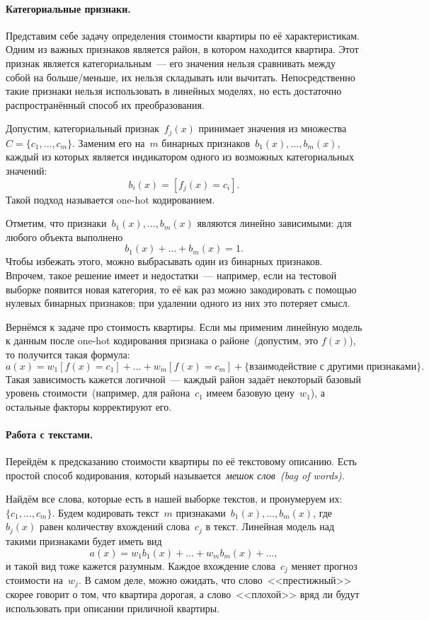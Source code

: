 \documentclass[12pt,fleqn]{article}
\begin{document}
\paragraph{Категориальные признаки.}
Представим себе задачу определения стоимости квартиры по её характеристикам.
Одним из важных признаков является район, в котором находится квартира.
Этот признак является категориальным~--- его значения нельзя сравнивать между собой на больше/меньше,
их нельзя складывать или вычитать.
Непосредственно такие признаки нельзя использовать в линейных моделях, но есть
достаточно распространённый способ их преобразования.

Допустим, категориальный признак~$f_j(x)$ принимает значения из множества~$C = \{c_1, \dots, c_m\}$.
Заменим его на~$m$ бинарных признаков~$b_1(x), \dots, b_m(x)$, каждый из которых
является индикатором одного из возможных категориальных значений:
\[
b_i(x) = [f_j(x) = c_i].
\]
Такой подход называется one-hot кодированием.

Отметим, что признаки~$b_1(x), \dots, b_m(x)$ являются линейно зависимыми:
для любого объекта выполнено
\[
b_1(x) + \dots + b_m(x) = 1.
\]
Чтобы избежать этого, можно выбрасывать один из бинарных признаков.
Впрочем, такое решение имеет и недостатки~--- например, если на тестовой выборке
появится новая категория, то её как раз можно закодировать с помощью нулевых бинарных признаков;
при удалении одного из них это потеряет смысл.

Вернёмся к задаче про стоимость квартиры.
Если мы применим линейную модель к данным после one-hot кодирования признака о районе~(допустим, это $f(x)$), то получится
такая формула:
\[
a(x)
=
w_1 [f(x) = c_1]
+
\dots
+
w_m [f(x) = c_m]
+
\{
\text{взаимодействие с другими признаками}
\}.
\]
Такая зависимость кажется логичной~--- каждый район задаёт некоторый базовый уровень
стоимости~(например, для района~$c_1$ имеем базовую цену~$w_1$),
а остальные факторы корректируют его.

\paragraph{Работа с текстами.}

Перейдём к предсказанию стоимости квартиры по её текстовому описанию.
Есть простой способ кодирования, который называется~\emph{мешок слов~(bag of words)}.

Найдём все слова, которые есть в нашей выборке текстов, и пронумеруем их:~$\{c_1, \dots, c_m\}$.
Будем кодировать текст~$m$ признаками~$b_1(x), \dots, b_m(x)$, где~$b_j(x)$ равен
количеству вхождений слова~$c_j$ в текст.
Линейная модель над такими признаками будет иметь вид
\[
a(x)
=
w_1 b_1(x)
+
\dots
+
w_m b_m(x)
+
\dots,
\]
и такой вид тоже кажется разумным.
Каждое вхождение слова~$c_j$ меняет прогноз стоимости на~$w_j$.
В самом деле, можно ожидать, что слово~<<престижный>> скорее говорит о том,
что квартира дорогая, а слово~<<плохой>> вряд ли будут использовать при описании
приличной квартиры.
\end{document}
